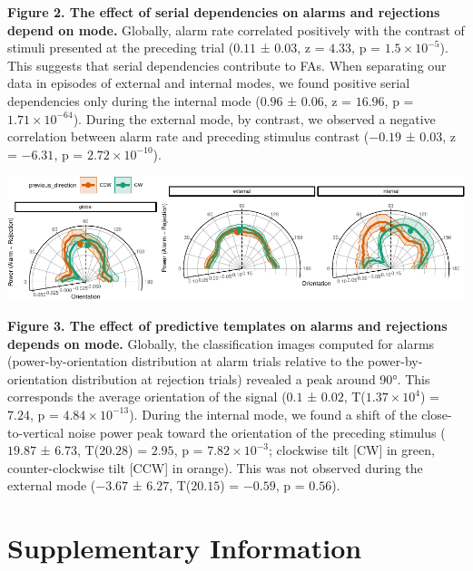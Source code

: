 \documentclass[
]{article}
\begin{document}
\textbf{Figure 2. The effect of serial dependencies on alarms and
rejections depend on mode.} Globally, alarm rate correlated positively
with the contrast of stimuli presented at the preceding trial (\(0.11\)
± \(0.03\), z = \(4.33\), p = \(\ensuremath{1.5\times 10^{-5}}\)). This
suggests that serial dependencies contribute to FAs. When separating our
data in episodes of external and internal modes, we found positive
serial dependencies only during the internal mode (\(0.96\) ± \(0.06\),
z = \(16.96\), p = \(\ensuremath{1.71\times 10^{-64}}\)). During the
external mode, by contrast, we observed a negative correlation between
alarm rate and preceding stimulus contrast (\(-0.19\) ± \(0.03\), z =
\(-6.31\), p = \(\ensuremath{2.72\times 10^{-10}}\)).

\includegraphics{predictive_templates_files/figure-latex/Figure_3-1.pdf}

\textbf{Figure 3. The effect of predictive templates on alarms and
rejections depends on mode.} Globally, the classification images
computed for alarms (power-by-orientation distribution at alarm trials
relative to the power-by-orientation distribution at rejection trials)
revealed a peak around 90°. This corresponds the average orientation of
the signal (\(0.1\) ± \(0.02\), T(\(\ensuremath{1.37\times 10^{4}}\)) =
\(7.24\), p = \(\ensuremath{4.84\times 10^{-13}}\)). During the internal
mode, we found a shift of the close-to-vertical noise power peak toward
the orientation of the preceding stimulus (\(19.87\) ± \(6.73\),
T(\(20.28\)) = \(2.95\), p = \(\ensuremath{7.82\times 10^{-3}}\);
clockwise tilt {[}CW{]} in green, counter-clockwise tilt {[}CCW{]} in
orange). This was not observed during the external mode (\(-3.67\) ±
\(6.27\), T(\(20.15\)) = \(-0.59\), p = \(0.56\)).

\newpage

\hypertarget{supplementary-information}{%
\section{Supplementary Information}\label{supplementary-information}}

\newpage
\end{document}
